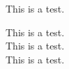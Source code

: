 \documentclass{article}
\begin{document}
This is a test.

This is a test.\\

This is a test.\\
This is a test.
\end{document}
